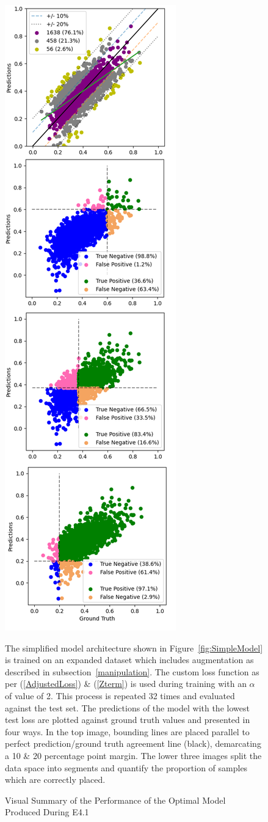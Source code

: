 \begin{figure}[p]
	\centering
	\includegraphics[scale=0.45]{Figures/E4p1optimal.png}
	\caption{Visual Summary of the Performance of the Optimal Model Produced During E4.1} {The simplified model architecture shown in Figure~\ref{fig:SimpleModel} is trained on an expanded dataset which includes augmentation as described in subsection~\ref{manipulation}. The custom loss function as per (\ref{AdjustedLoss}) \& (\ref{Zterm}) is used during training with an $\alpha$ of value of 2. This process is repeated 32 times and evaluated against the test set. The predictions of the model with the lowest test loss are plotted against ground truth values and presented in four ways. In the top image, bounding lines are placed parallel to perfect prediction/ground truth agreement line (black), demarcating a 10 \& 20 percentage point margin. The lower three images split the data space into segments and quantify the proportion of samples which are correctly placed.}

\end{figure}
